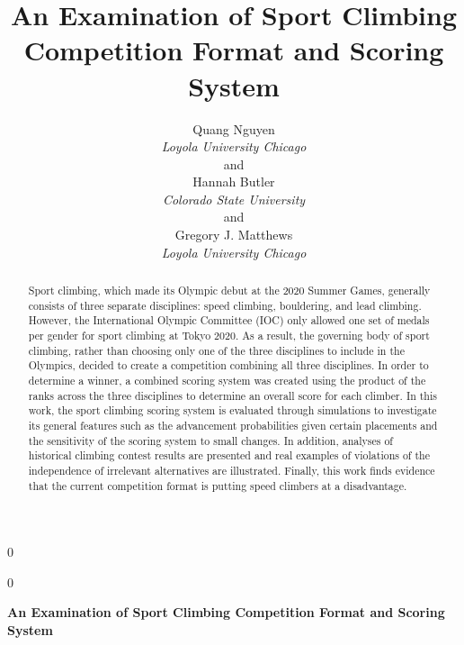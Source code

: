 \documentclass[12pt]{article}
\newcommand{\blind}{0}
\begin{document}
\def\spacingset#1{\renewcommand{\baselinestretch}%
{#1}\small\normalsize} \spacingset{1}



\blind
{
  \title{\bf An Examination of Sport Climbing Competition Format and
Scoring System}

  \author{
        Quang Nguyen \\
    \textit{Loyola University Chicago}\\
     and \\     Hannah Butler \\
    \textit{Colorado State University}\\
     and \\     Gregory J. Matthews \\
    \textit{Loyola University Chicago}\\
      }
  \maketitle
} \fi

\blind
{
  \bigskip
  \bigskip
  \bigskip
  \begin{center}
    {\LARGE\bf An Examination of Sport Climbing Competition Format and
Scoring System}
  \end{center}
  \medskip
} \fi

\bigskip
\begin{abstract}
Sport climbing, which made its Olympic debut at the 2020 Summer Games,
generally consists of three separate disciplines: speed climbing,
bouldering, and lead climbing. However, the International Olympic
Committee (IOC) only allowed one set of medals per gender for sport
climbing at Tokyo 2020. As a result, the governing body of sport
climbing, rather than choosing only one of the three disciplines to
include in the Olympics, decided to create a competition combining all
three disciplines. In order to determine a winner, a combined scoring
system was created using the product of the ranks across the three
disciplines to determine an overall score for each climber. In this
work, the sport climbing scoring system is evaluated through simulations
to investigate its general features such as the advancement
probabilities given certain placements and the sensitivity of the
scoring system to small changes. In addition, analyses of historical
climbing contest results are presented and real examples of violations
of the independence of irrelevant alternatives are illustrated. Finally,
this work finds evidence that the current competition format is putting
speed climbers at a disadvantage.
\end{abstract}
\end{document}
